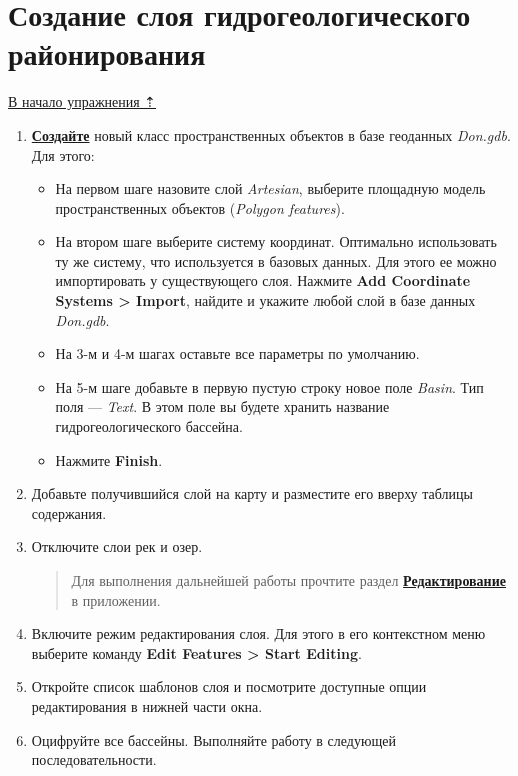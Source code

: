 \documentclass[]{book}
\theoremstyle{definition}
\theoremstyle{definition}
\theoremstyle{definition}
\theoremstyle{remark}
\begin{document}
\hypertarget{map-ref-hydrogeologic-regions}{%
\section{Создание слоя гидрогеологического
районирования}\label{map-ref-hydrogeologic-regions}}

\protect\hyperlink{map-ref-hydrogeologic}{В начало упражнения ⇡}

\begin{enumerate}
\def\labelenumi{\arabic{enumi}.}
\item
  \textbf{\protect\hyperlink{manual-gdb-create-class}{Создайте}} новый
  класс пространственных объектов в базе геоданных \emph{Don.gdb}. Для
  этого:

  \begin{itemize}
  \item
    На первом шаге назовите слой \emph{Artesian}, выберите площадную
    модель пространственных объектов (\emph{Polygon features}).
  \item
    На втором шаге выберите систему координат. Оптимально использовать
    ту же систему, что используется в базовых данных. Для этого ее можно
    импортировать у существующего слоя. Нажмите \textbf{Add Coordinate
    Systems \textgreater{} Import}, найдите и укажите любой слой в базе
    данных \emph{Don.gdb}.
  \item
    На 3-м и 4-м шагах оставьте все параметры по умолчанию.
  \item
    На 5-м шаге добавьте в первую пустую строку новое поле \emph{Basin}.
    Тип поля --- \emph{Text}. В этом поле вы будете хранить название
    гидрогеологического бассейна.
  \item
    Нажмите \textbf{Finish}.
  \end{itemize}
\item
  Добавьте получившийся слой на карту и разместите его вверху таблицы
  содержания.
\item
  Отключите слои рек и озер.

  \begin{quote}
  Для выполнения дальнейшей работы прочтите раздел
  \textbf{\protect\hyperlink{manual-edit}{Редактирование}} в приложении.
  \end{quote}
\item
  Включите режим редактирования слоя. Для этого в его контекстном меню
  выберите команду \textbf{Edit Features \textgreater{} Start Editing}.
\item
  Откройте список шаблонов слоя и посмотрите доступные опции
  редактирования в нижней части окна.
\item
  Оцифруйте все бассейны. Выполняйте работу в следующей
  последовательности.


\end{enumerate}
\end{document}

